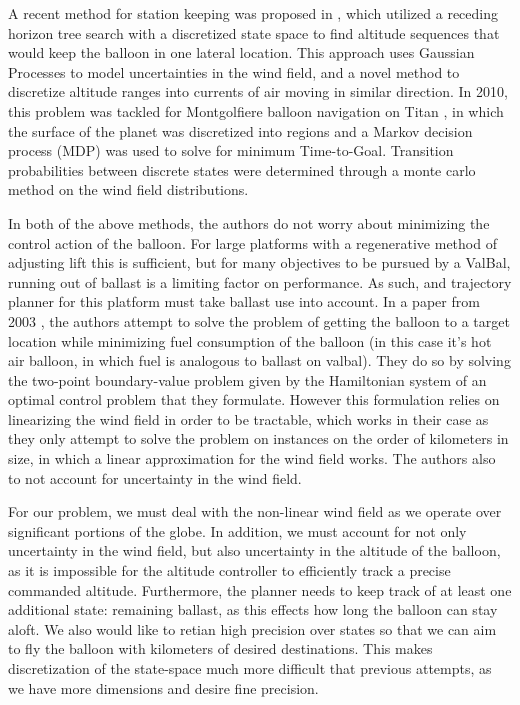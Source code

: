 \documentclass[11pt]{scrartcl} %
\begin{document}
A recent method for station keeping was proposed in \cite{DBorn}, which utilized a receding horizon tree search with a discretized state space to find altitude sequences that would keep the balloon in one lateral location. This approach uses Gaussian Processes to model uncertainties in the wind field, and a novel method to discretize altitude ranges into currents of air moving in similar direction. In 2010, this problem was tackled for Montgolfiere balloon navigation on Titan \cite{wolf2010}, in which the surface of the planet was discretized into regions and a Markov decision process (MDP) was used to solve for minimum Time-to-Goal. Transition probabilities between discrete states were determined through a monte carlo method on the wind field distributions. 

In both of the above methods, the authors do not worry about minimizing the control action of the balloon. For large platforms with a regenerative method of adjusting lift this is sufficient, but for many objectives to be pursued by a ValBal, running out of ballast is a limiting factor on performance. As such, and trajectory planner for this platform must take ballast use into account. In a paper from 2003  \cite{das2003optimal}, the authors attempt to solve the problem of getting the balloon to a target location while minimizing fuel consumption of the balloon (in this case it's hot air balloon, in which fuel is analogous to ballast on valbal). They do so by solving the two-point boundary-value problem given by the Hamiltonian system of an optimal control problem that they formulate. However this formulation relies on linearizing the wind field in order to be tractable, which works in their case as they only attempt to solve the problem on instances on the order of kilometers in size, in which a linear approximation for the wind field works. The authors also to not account for uncertainty in the wind field.

For our problem, we must deal with the non-linear wind field as we operate over significant portions of the globe. In addition, we must account for not only uncertainty in the wind field, but also uncertainty in the altitude of the balloon, as it is impossible for the altitude controller to efficiently track a precise commanded altitude. Furthermore, the planner needs to keep track of at least one additional state: remaining ballast, as this effects how long the balloon can stay aloft. We also would like to retian high precision over states so that we can aim to fly the balloon with kilometers of desired destinations. This makes discretization of the state-space much more difficult that previous attempts, as we have more dimensions and desire fine precision.
\end{document}
